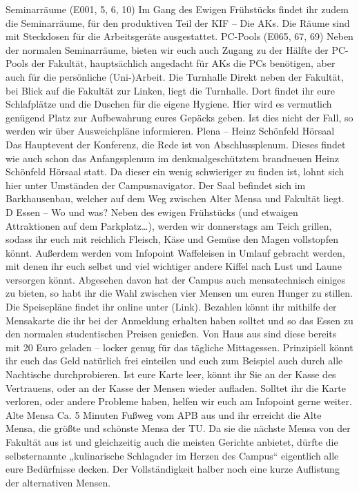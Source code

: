 Seminarräume (E001, 5, 6, 10)
Im Gang des Ewigen Frühstücks findet ihr zudem die Seminarräume, für den produktiven Teil der KIF – Die AKs. Die Räume sind mit Steckdosen für die Arbeitsgeräte ausgestattet.
PC-Pools (E065, 67, 69)
Neben der normalen Seminarräume, bieten wir euch auch Zugang zu der Hälfte der PC-Pools der Fakultät, hauptsächlich angedacht für AKs die PCs benötigen, aber auch für die persönliche (Uni-)Arbeit.
Die Turnhalle
Direkt neben der Fakultät, bei Blick auf die Fakultät zur Linken, liegt die Turnhalle. Dort findet ihr eure Schlafplätze und die Duschen für die eigene Hygiene. Hier wird es vermutlich genügend Platz zur Aufbewahrung eures Gepäcks geben. Ist dies nicht der Fall, so werden wir über Ausweichpläne informieren. 
Plena – Heinz Schönfeld Hörsaal
Das Hauptevent der Konferenz, die Rede ist von Abschlussplenum. Dieses findet wie auch schon das Anfangsplenum im denkmalgeschütztem brandneuen Heinz Schönfeld Hörsaal statt. Da dieser ein wenig schwieriger zu finden ist, lohnt sich hier unter Umständen der Campusnavigator. Der Saal befindet sich im Barkhausenbau, welcher auf dem Weg zwischen Alter Mensa und Fakultät liegt. D
Essen – Wo und was?
Neben des ewigen Frühstücks (und etwaigen Attraktionen auf dem Parkplatz…), werden wir donnerstags am Teich grillen, sodass ihr euch mit reichlich Fleisch, Käse und Gemüse den Magen vollstopfen könnt. Außerdem werden vom Infopoint Waffeleisen in Umlauf gebracht werden, mit denen ihr euch selbst und viel wichtiger andere Kiffel nach Lust und Laune versorgen könnt.
Abgesehen davon hat der Campus auch mensatechnisch einiges zu bieten, so habt ihr die Wahl zwischen vier Mensen um euren Hunger zu stillen. Die Speisepläne findet ihr online unter (Link). Bezahlen könnt ihr mithilfe der Mensakarte die ihr bei der Anmeldung erhalten haben solltet und so das Essen zu den normalen studentischen Preisen genießen. Von Haus aus sind diese bereits mit 20 Euro geladen – locker genug für das tägliche Mittagessen. Prinzipiell könnt ihr euch das Geld natürlich frei einteilen und euch zum Beispiel auch durch alle Nachtische durchprobieren. Ist eure Karte leer, könnt ihr Sie an der Kasse des Vertrauens, oder an der Kasse der Mensen wieder aufladen. Solltet ihr die Karte verloren, oder andere Probleme haben, helfen wir euch am Infopoint gerne weiter.
Alte Mensa
Ca. 5 Minuten Fußweg vom APB aus und ihr erreicht die Alte Mensa, die größte und schönste Mensa der TU. Da sie die nächste Mensa von der Fakultät aus ist und gleichzeitig auch die meisten Gerichte anbietet, dürfte die selbsternannte „kulinarische Schlagader im Herzen des Campus“ eigentlich alle eure Bedürfnisse decken. Der Vollständigkeit halber noch eine kurze Auflistung der alternativen Mensen.

